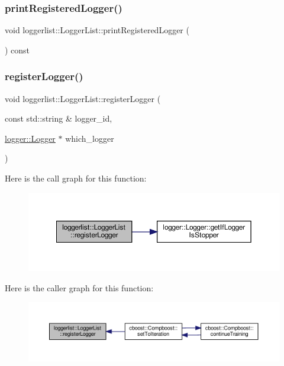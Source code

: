 \subsubsection{\texorpdfstring{print\+Registered\+Logger()}{printRegisteredLogger()}}
{\footnotesize\ttfamily void loggerlist\+::\+Logger\+List\+::print\+Registered\+Logger (\begin{DoxyParamCaption}{ }\end{DoxyParamCaption}) const}

\mbox{\label{classloggerlist_1_1_logger_list_a883c2526c3e56e572df670f64b966d41}} 
\subsubsection{\texorpdfstring{register\+Logger()}{registerLogger()}}
{\footnotesize\ttfamily void loggerlist\+::\+Logger\+List\+::register\+Logger (\begin{DoxyParamCaption}\item[{const std\+::string \&}]{logger\+\_\+id,  }\item[{\hyperlink{classlogger_1_1_logger}{logger\+::\+Logger} $\ast$}]{which\+\_\+logger }\end{DoxyParamCaption})}

Here is the call graph for this function\+:
\nopagebreak
\begin{figure}[H]
\begin{center}
\leavevmode
\includegraphics[width=350pt]{classloggerlist_1_1_logger_list_a883c2526c3e56e572df670f64b966d41_cgraph}
\end{center}
\end{figure}
Here is the caller graph for this function\+:
\nopagebreak
\begin{figure}[H]
\begin{center}
\leavevmode
\includegraphics[width=350pt]{classloggerlist_1_1_logger_list_a883c2526c3e56e572df670f64b966d41_icgraph}
\end{center}
\end{figure}


